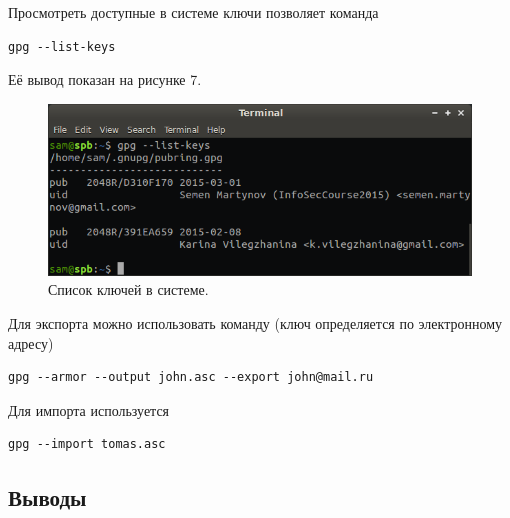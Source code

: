 \documentclass[a4paper, 12pt]{article}		%
\begin{document}
Просмотреть доступные в системе ключи позволяет команда
\begin{verbatim}gpg --list-keys
\end{verbatim}
Её вывод показан на рисунке 7.

\begin{figure}[h!]
\centering
\includegraphics[scale=0.8]{res/gpg-list}
\caption{Список ключей в системе.}
\end{figure}

Для экспорта можно использовать команду (ключ определяется по электронному адресу)
\begin{verbatim}gpg --armor --output john.asc --export john@mail.ru
\end{verbatim}

Для импорта используется
\begin{verbatim}gpg --import tomas.asc
\end{verbatim}

\subsection{Выводы}
\end{document}
